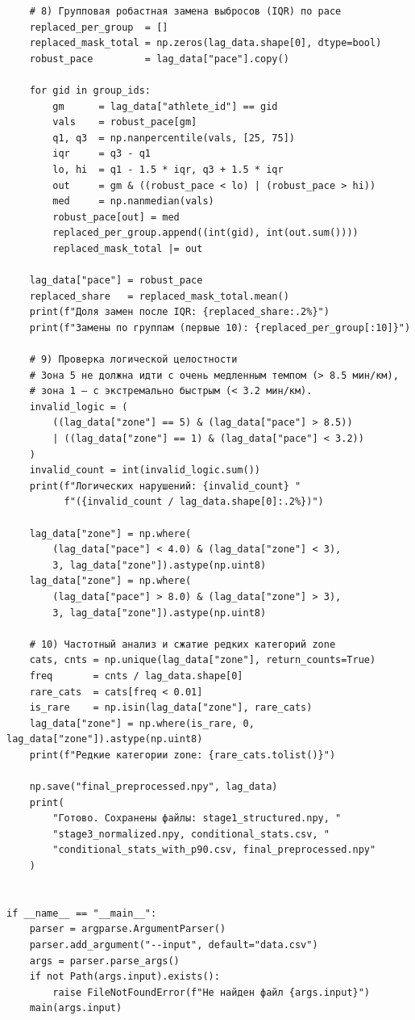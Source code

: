 \documentclass[oneside,a4paper,14pt]{extarticle}
\begin{document}
\newpage
\small
\begin{verbatim}
    # 8) Групповая робастная замена выбросов (IQR) по pace
    replaced_per_group  = []
    replaced_mask_total = np.zeros(lag_data.shape[0], dtype=bool)
    robust_pace         = lag_data["pace"].copy()

    for gid in group_ids:
        gm      = lag_data["athlete_id"] == gid
        vals    = robust_pace[gm]
        q1, q3  = np.nanpercentile(vals, [25, 75])
        iqr     = q3 - q1
        lo, hi  = q1 - 1.5 * iqr, q3 + 1.5 * iqr
        out     = gm & ((robust_pace < lo) | (robust_pace > hi))
        med     = np.nanmedian(vals)
        robust_pace[out] = med
        replaced_per_group.append((int(gid), int(out.sum())))
        replaced_mask_total |= out

    lag_data["pace"] = robust_pace
    replaced_share   = replaced_mask_total.mean()
    print(f"Доля замен после IQR: {replaced_share:.2%}")
    print(f"Замены по группам (первые 10): {replaced_per_group[:10]}")

    # 9) Проверка логической целостности
    # Зона 5 не должна идти с очень медленным темпом (> 8.5 мин/км),
    # зона 1 — с экстремально быстрым (< 3.2 мин/км).
    invalid_logic = (
        ((lag_data["zone"] == 5) & (lag_data["pace"] > 8.5))
        | ((lag_data["zone"] == 1) & (lag_data["pace"] < 3.2))
    )
    invalid_count = int(invalid_logic.sum())
    print(f"Логических нарушений: {invalid_count} "
          f"({invalid_count / lag_data.shape[0]:.2%})")

    lag_data["zone"] = np.where(
        (lag_data["pace"] < 4.0) & (lag_data["zone"] < 3),
        3, lag_data["zone"]).astype(np.uint8)
    lag_data["zone"] = np.where(
        (lag_data["pace"] > 8.0) & (lag_data["zone"] > 3),
        3, lag_data["zone"]).astype(np.uint8)

    # 10) Частотный анализ и сжатие редких категорий zone
    cats, cnts = np.unique(lag_data["zone"], return_counts=True)
    freq       = cnts / lag_data.shape[0]
    rare_cats  = cats[freq < 0.01]
    is_rare    = np.isin(lag_data["zone"], rare_cats)
    lag_data["zone"] = np.where(is_rare, 0, lag_data["zone"]).astype(np.uint8)
    print(f"Редкие категории zone: {rare_cats.tolist()}")

    np.save("final_preprocessed.npy", lag_data)
    print(
        "Готово. Сохранены файлы: stage1_structured.npy, "
        "stage3_normalized.npy, conditional_stats.csv, "
        "conditional_stats_with_p90.csv, final_preprocessed.npy"
    )


if __name__ == "__main__":
    parser = argparse.ArgumentParser()
    parser.add_argument("--input", default="data.csv")
    args = parser.parse_args()
    if not Path(args.input).exists():
        raise FileNotFoundError(f"Не найден файл {args.input}")
    main(args.input)
\end{verbatim}
\end{document}
